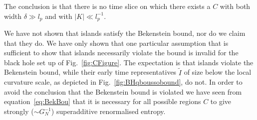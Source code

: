 \documentclass[a4paper,11pt]{article}
\newcommand{\cts}[1]{\ignorespaces}
\def\bne{\begin{equation}}
\def\ene{\end{equation}}
\newcommand{\del}{\partial}
\begin{document}

The conclusion is that there is no time slice on which there exists a $C$ with both width $\delta \gg l_p$ and with $|K| \ll l_p^{-1}$. 

We have not shown that islands satisfy the Bekenstein bound, nor do we claim that they do. We have only shown that one particular assumption that is sufficient to show that islands necessarily violate the bound is invalid for the black hole set up of Fig.~\ref{fig:CFigure}. The expectation is that islands violate the Bekenstein bound, while their early time representatives $\tilde{I}$ of size below the local curvature scale, as depicted in Fig.~\ref{fig:BHqboussobound}, do not. In order to avoid the conclusion that the Bekenstein bound is violated we have seen from equation~\eqref{eq:BekBou} that it is necessary for all possible regions $C$ to give strongly ($\sim G_N^{-1}$) superadditive renormalised entropy. 
\end{document}
